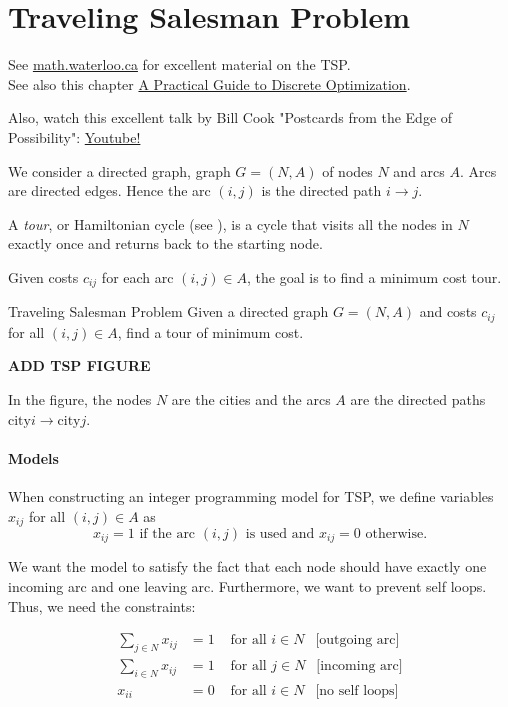 \documentclass[../open-optimization/open-optimization.tex]{subfiles}
\begin{document}
\section{Traveling Salesman Problem}
\label{sec:tsp-models}
See \href{http://www.math.uwaterloo.ca/tsp/index.html}{math.waterloo.ca} for excellent material on the TSP.\\
See also this chapter \href{https://www.math.uwaterloo.ca/~bico/papers/comp_chapter1.pdf}{A Practical Guide to Discrete
Optimization}.

Also, watch this excellent talk by Bill Cook "Postcards from the Edge of Possibility":
\href{https://m.youtube.com/watch?v=5VjphFYQKj8}{Youtube!}

We consider a directed graph, graph $G = (N,A)$ of nodes $N$ and arcs $A$.   Arcs are directed edges.  Hence the arc $(i,j)$ is the directed path $i \to j$.

A \emph{tour}, or Hamiltonian cycle (see ), is a cycle that visits all the nodes in $N$ exactly once and returns back to the starting node.


Given costs $c_{ij}$ for each arc $(i,j) \in A$, the goal is to find a minimum cost tour.


\begin{general}{Traveling Salesman Problem}{\nphard}
Given a directed graph $G = (N,A)$ and costs $c_{ij}$ for all $(i,j) \in A$, find a tour of minimum cost.
\end{general}
\begin{center}
\textbf{ADD TSP FIGURE}
\end{center}
In the figure, the nodes $N$ are the cities and the arcs $A$ are the directed paths $\text{city} i \to \text{city} j$.

\paragraph{Models}
When constructing an integer programming model for TSP, we define variables $x_{ij}$ for all $(i,j) \in A$ as 
$$
x_{ij } = 1 \text{ if the arc $(i,j)$ is used  and   }  x_{ij} = 0 \text{   otherwise.}
$$

We want the model to satisfy the fact that each node should have exactly one incoming arc and one leaving arc.  Furthermore, we want to prevent self loops.  Thus, we need the constraints:

\begin{align}
\label{eq:tsp-part-model}
\sum_{j\in N} x_{ij} &= 1 & \text{ for all } i \in N \ \ \text{ [outgoing arc]}\\
\sum_{i \in N} x_{ij} &= 1 & \text{ for all } j \in N \ \ \text{ [incoming arc]}\\
\label{eq:tsp-part-model3}
x_{ii} &= 0 & \text{ for all } i \in N \ \ \text{ [no self loops]} 
\end{align}
\end{document}

